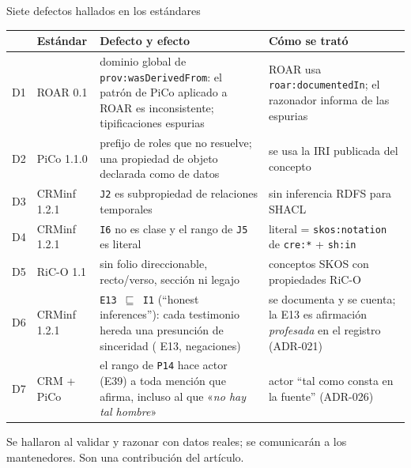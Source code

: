 \documentclass[aspectratio=169,10pt]{beamer}
\newcommand{\cita}[1]{«\textit{#1}»}
\newcommand{\ttt}[1]{\texttt{\small #1}}
\begin{document}
\begin{frame}{Siete defectos hallados en los estándares}
\scriptsize
\begin{tabular}{@{}p{0.5cm}p{2.1cm}p{5.6cm}p{4.9cm}@{}}
\toprule
& Estándar & Defecto y efecto & Cómo se trató \\
\midrule
D1 & ROAR 0.1 & dominio global de \ttt{prov:wasDerivedFrom}: el patrón de PiCo aplicado a ROAR es \alert{inconsistente}; \cifraDUnoEspurias{} tipificaciones espurias & ROAR usa \ttt{roar:documentedIn}; el razonador informa de las espurias \\
D2 & PiCo 1.1.0 & prefijo de roles que no resuelve; una propiedad de objeto declarada como de datos & se usa la IRI publicada del concepto \\
D3 & CRMinf 1.2.1 & \ttt{J2} es subpropiedad de relaciones temporales & sin inferencia RDFS para SHACL \\
D4 & CRMinf 1.2.1 & \ttt{I6} no es clase y el rango de \ttt{J5} es literal & literal = \ttt{skos:notation} de \ttt{cre:*} + \ttt{sh:in} \\
D5 & RiC-O 1.1 & sin folio direccionable, recto/verso, sección ni legajo & conceptos SKOS con propiedades RiC-O \\
D6 & CRMinf 1.2.1 & \ttt{E13 $\sqsubseteq$ I1} (\enquote{honest inferences}): cada testimonio hereda una \alert{presunción de sinceridad} (\cifraDSeisAfirmaciones{} E13, \cifraDSeisNegaciones{} negaciones) & se documenta y se cuenta; la E13 es afirmación \emph{profesada} en el registro (ADR-021) \\
D7 & CRM + PiCo & el rango de \ttt{P14} hace actor (E39) a toda mención que afirma, incluso al que \cita{no hay tal hombre} & actor \enquote{tal como consta en la fuente} (ADR-026) \\
\bottomrule
\end{tabular}

\medskip
\footnotesize Se hallaron al validar y razonar con datos reales; se comunicarán a los mantenedores. Son una contribución del
artículo.
\end{frame}
\end{document}

